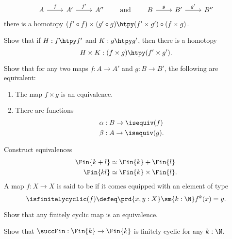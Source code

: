 \begin{exercises}
\begin{subexenum}
\begin{equation*}
\begin{tikzcd}
        A \arrow[r,"f"] & {A'} \arrow[r,"{f'}"] & {A''}
      \end{tikzcd}
      \qquad\text{and}\qquad
      \begin{tikzcd}
        B \arrow[r,"g"] & {B'} \arrow[r,"{g'}"] & {B''}
      \end{tikzcd}
    \end{equation*}
    there is a homotopy $(f'\circ f)\times(g'\circ g) \htpy (f'\times g')\circ (f\times g)$.
  \item Show that if $H:f\htpy f'$ and $K:g\htpy g'$, then there is a homotopy
    \begin{equation*}
      H\times K:(f\times g)\htpy (f'\times g').
    \end{equation*}
  \item Show that for any two maps $f:A\to A'$ and $g:B\to B'$, the following are equivalent:
    \begin{enumerate}
    \item The map $f\times g$ is an equivalence.
    \item There are functions
      \begin{align*}
        \alpha & : B \to \isequiv(f) \\
        \beta & : A \to \isequiv(g).
      \end{align*}
    \end{enumerate}
  \end{subexenum}
  \exitem\label{ex:laws-Fin} Construct equivalences
  \begin{align*}
    \Fin{k+l} & \simeq \Fin{k}+\Fin{l} \\
    \Fin{kl} & \simeq \Fin{k}\times\Fin{l}.
  \end{align*}
  \exitem A map $f:X\to X$ is said to be  if it comes equipped with an element of type
  \begin{equation*}
    \isfinitelycyclic(f)\defeq\prd{x,y:X}\sm{k:\N}f^k(x)=y.
  \end{equation*}
  \begin{subexenum}
  \item Show that any finitely cyclic map is an equivalence.
  \item Show that $\succFin:\Fin{k}\to\Fin{k}$ is finitely cyclic for any $k:\N$.
  \end{subexenum}
\end{exercises}

